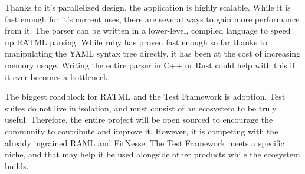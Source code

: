 Thanks to it's parallelized design, the application is highly scalable. While it is fast enough for it's current uses, there are several ways to gain more performance from it. The parser can be written in a lower-level, compiled language to speed up RATML parsing. While ruby has proven fast enough so far thanks to manipulating the YAML syntax tree directly, it has been at the cost of increasing memory usage. Writing the entire parser in C++ or Rust could help with this if it ever becomes a bottleneck.

The biggest roadblock for RATML and the Test Framework is adoption. Test suites do not live in isolation, and must consist of an ecosystem to be truly useful. Therefore, the entire project will be open sourced to encourage the community to contribute and improve it. However, it is competing with the already ingrained RAML and FitNesse. The Test Framework meets a specific niche, and that may help it be used alongside other products while the ecosystem builds.